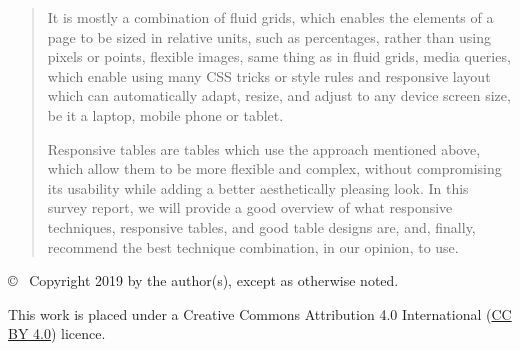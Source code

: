 \documentclass[11pt,onecolumn,twoside]{report}
\begin{document}
\begin{titlepage}
\begin{quote}
It is mostly a combination of fluid grids, which enables the elements of a page to be sized in relative units, such as percentages, rather than using pixels or points, flexible images, same thing as in fluid grids, media queries, which enable using many CSS tricks or style rules and responsive layout which can automatically adapt, resize, and adjust to any device screen size, be it a laptop, mobile phone or tablet.


Responsive tables are tables which use the approach mentioned above, which allow them to be more flexible and complex, without compromising its usability while adding a better aesthetically pleasing look. In this survey report, we will provide a good overview of what responsive techniques, responsive tables, and good table designs are, and, finally, recommend the best technique combination, in our opinion, to use. 

\end{quote}

\vfill

\begin{center}
{\footnotesize\sffamily \copyright ~ Copyright 2019 by the author(s),
except as otherwise noted.}

\vspace{2mm}
{\footnotesize\sffamily This work is placed under a
Creative Commons Attribution 4.0 International
(\href{https://creativecommons.org/licenses/by/4.0/}{CC BY 4.0}) licence.}
\end{center}

\end{titlepage}




\cleardoublepage
\pagestyle{plain}             %


\begin{spacing}{0.8}
\tableofcontents
\end{spacing}

\cleardoublepage
\begin{spacing}{0.8}
\listoffigures
\end{spacing}


\end{document}
